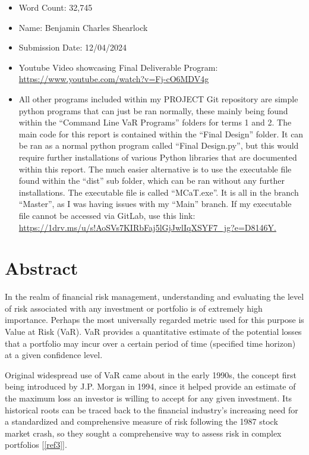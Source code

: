 \documentclass{article}
\begin{document}
\begin{itemize}
  \item Word Count: 32,745
  \item Name: Benjamin Charles Shearlock
  \item Submission Date: 12/04/2024
  \item Youtube Video showcasing Final Deliverable Program: \url{https://www.youtube.com/watch?v=Fj-cO6MDV4g}
  \item All other programs included within my PROJECT Git repository are simple python programs that can just be ran normally, these mainly being found within the ``Command Line VaR Programs'' folders for terms 1 and 2. The main code for this report is contained within the ``Final Design'' folder. It can be ran as a normal python program called ``Final Design.py'', but this would require further installations of various Python libraries that are documented within this report. The much easier alternative is to use the executable file found within the ``dist'' sub folder, which can be ran without any further installations. The executable file is called ``MCaT.exe''. It is all in the branch “Master”, as I was having issues with my “Main” branch. If my executable file cannot be accessed via GitLab, use this link: \url{https://1drv.ms/u/s!AoSVs7KIRbFaj5lGjJwlIqXSYF7_jg?e=D8146Y.}


\end{itemize}

\newpage

\tableofcontents

\newpage

\section{Abstract}
In the realm of financial risk management, understanding and evaluating the level of risk associated with any investment or portfolio is of extremely high importance. Perhaps the most universally regarded metric used for this purpose is Value at Risk (VaR). VaR provides a quantitative estimate of the potential losses that a portfolio may incur over a certain period of time (specified time horizon) at a given confidence level. \\\vspace{0.3cm}

Original widespread use of VaR came about in the early 1990s, the concept first being introduced by J.P. Morgan in 1994, since it helped provide an estimate of the maximum loss an investor is willing to accept for any given investment. Its historical roots can be traced back to the financial industry's increasing need for a standardized and comprehensive measure of risk following the 1987 stock market crash, so they sought a comprehensive way to assess risk in complex portfolios [\ref{ref3}]. \\
\end{document}
